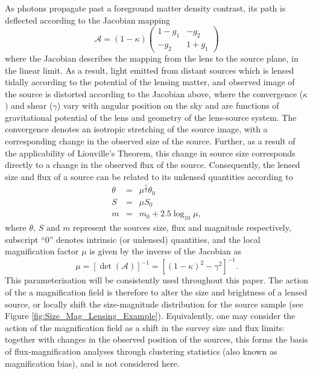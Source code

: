 \documentclass[useAMS,usenatbib,times,letter,amssymb]{mn2e}
\def\be{\begin{equation}}
\def\ee{\end{equation}}
\def\bea{\begin{eqnarray}}
\def\eea{\end{eqnarray}}
\def\lg10{\log_{10}}
\begin{document}
As photons propagate past a foreground matter density contrast, its path is deflected according to the Jacobian mapping
\be
\mathcal{A} = (1-\kappa) \begin{pmatrix} 1 -g_1 & -g_2 \\ -g_2 & 1+g_1  \end{pmatrix}
\ee
where the Jacobian describes the mapping from the lens to the source plane, in the linear limit. As a result, light emitted from distant sources which is lensed tidally according to the potential of the lensing matter, and observed image of the source is distorted according to the Jacobian above, where the convergence ($\kappa$) and shear ($\gamma$) vary with angular position on the sky and are functions of gravitational potential of the lens and geometry of the lens-source system. The convergence denotes an isotropic stretching of the source image, with a corresponding change in the observed size of the source. Further, as a result of the applicability of Liouville's Theorem, this change in source size corresponds directly to a change in the observed flux of the source. Consequently, the lensed size and flux of a source can be related to its unlensed quantities according to 
\bea
\theta &=& \mu^{\frac{1}{2}}\theta_0 \label{eqn:Lensing_Relations__Size}\\
S &=& \mu S_0 \label{eqn:Lensing_Relations__Flux}\\
m &=& m_0 +2.5\lg10{\mu}, \label{eqn:Lensing_Relations__Magnitude}
\eea
where $\theta$, $S$ and $m$ represent the sources size, flux and magnitude respectively, subscript ``$0$'' denotes intrinsic (or unlensed) quantities, and the local magnification factor $\mu$ is given by the inverse of the Jacobian as
\be
\mu = [\det(\mathcal{A})]^{-1} = [(1-\kappa)^2 - \gamma^2]^{-1}.
\ee
 This parameterisation will be consistently used throughout this paper. The action of the a magnification field is therefore to alter the size and brightness of a lensed source, or locally shift the size-magnitude distribution for the source sample (see Figure \ref{fig:Size_Mag_Lensing_Example}). Equivalently, one may consider the action of the magnification field as a shift in the survey size and flux limits: together with changes in the observed position of the sources, this forms the basis of flux-magnification analyses through clustering statistics (also known as magnification bias), and is not considered here. 
\end{document}

